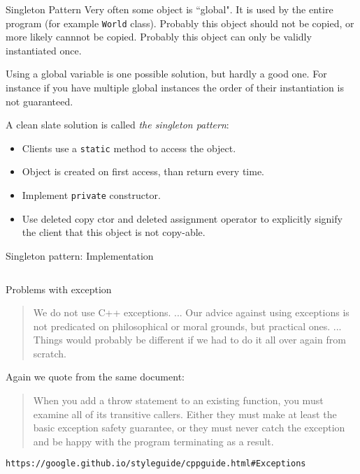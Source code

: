 \begin{frame}{Singleton Pattern}
Very often some object is ``global". It is used by the entire program (for example \texttt{World} class). Probably this object should not be copied, or more likely cannnot be copied. Probably this object can only be validly instantiated once.

Using a global variable is one possible solution, but hardly a good one. For instance if you have multiple global instances the order of their instantiation is not guaranteed. 

A clean slate solution is called \textit{the singleton pattern}:

\begin{itemize}
	\item Clients use a \texttt{static} method to access the object.
	\item Object is created on first access, than return every time.
	\item Implement \texttt{private} constructor.
	\item Use deleted copy ctor and deleted assignment operator to explicitly signify the client that this object is not copy-able.
\end{itemize}
\end{frame}

\begin{frame}{Singleton pattern: Implementation}
\inputminted[fontsize=\small]{c++}{code/rc9sgt/sgt.h}
\end{frame}

\begin{frame}[fragile]{Problems with exception}
\begin{quotation}
	\alert{We do not use C++ exceptions}. ... Our advice against using exceptions is not predicated on philosophical or moral grounds, but practical ones. ... Things would probably be different if we had to do it all over again from scratch.
\end{quotation}


Again we quote from the same document:
\begin{quotation}
	When you add a throw statement to an existing function, you must examine all of its transitive callers. Either they must make at least the \alert{basic exception safety guarantee}, or they must never catch the exception and be happy with the program terminating as a result.
\end{quotation}

\tiny{\verb|https://google.github.io/styleguide/cppguide.html#Exceptions|}
\end{frame}

